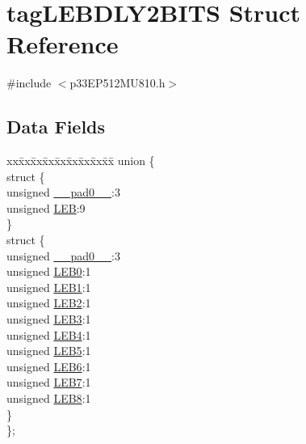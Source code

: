 \hypertarget{structtag_l_e_b_d_l_y2_b_i_t_s}{}\section{tag\+L\+E\+B\+D\+L\+Y2\+B\+I\+TS Struct Reference}
\label{structtag_l_e_b_d_l_y2_b_i_t_s}


{\ttfamily \#include $<$p33\+E\+P512\+M\+U810.\+h$>$}

\subsection*{Data Fields}
\begin{DoxyCompactItemize}
\item 
\begin{tabbing}
xx\=xx\=xx\=xx\=xx\=xx\=xx\=xx\=xx\=\kill
union \{\\
\>struct \{\\
\>\>unsigned \hyperlink{structtag_l_e_b_d_l_y2_b_i_t_s_adf71f3d8410c1f1dbbc96680a92c49af}{\_\_pad0\_\_}:3\\
\>\>unsigned \hyperlink{structtag_l_e_b_d_l_y2_b_i_t_s_a850b96052b17c96a4012653317c39bdf}{LEB}:9\\
\>\} \\
\>struct \{\\
\>\>unsigned \hyperlink{structtag_l_e_b_d_l_y2_b_i_t_s_adf71f3d8410c1f1dbbc96680a92c49af}{\_\_pad0\_\_}:3\\
\>\>unsigned \hyperlink{structtag_l_e_b_d_l_y2_b_i_t_s_a1710dcadd784ef12033a5cf8121accb3}{LEB0}:1\\
\>\>unsigned \hyperlink{structtag_l_e_b_d_l_y2_b_i_t_s_ab0505c0f812822c77a65e8bfe2db4f40}{LEB1}:1\\
\>\>unsigned \hyperlink{structtag_l_e_b_d_l_y2_b_i_t_s_a120826056ccccfac30aa9e8a0569ae88}{LEB2}:1\\
\>\>unsigned \hyperlink{structtag_l_e_b_d_l_y2_b_i_t_s_a7b918c1b7306fd3ff86ab19bcb5365a4}{LEB3}:1\\
\>\>unsigned \hyperlink{structtag_l_e_b_d_l_y2_b_i_t_s_a5fbd877152dfc4182c4456b4224ec747}{LEB4}:1\\
\>\>unsigned \hyperlink{structtag_l_e_b_d_l_y2_b_i_t_s_a4371c46a68a319773f493c25667df943}{LEB5}:1\\
\>\>unsigned \hyperlink{structtag_l_e_b_d_l_y2_b_i_t_s_a2b8fccc4fb31a13c611cfb0d1c53aff0}{LEB6}:1\\
\>\>unsigned \hyperlink{structtag_l_e_b_d_l_y2_b_i_t_s_aa76d586b04119d8459718019ddd964ef}{LEB7}:1\\
\>\>unsigned \hyperlink{structtag_l_e_b_d_l_y2_b_i_t_s_a9b22b47001301c6ae00c3eea0f385091}{LEB8}:1\\
\>\} \\
\}; \\

\end{tabbing}\end{DoxyCompactItemize}


